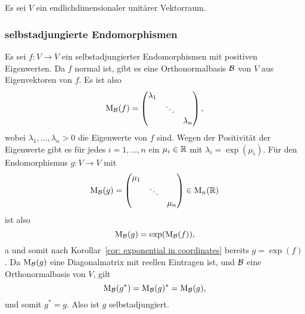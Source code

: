 \documentclass[a4paper, 10pt, numbers=noenddot]{scrartcl}
\begin{document}
\subsection{}
Es sei $V$ ein endlichdimensionaler unitärer Vektorraum.


\subsubsection{selbstadjungierte Endomorphismen}
Es sei $f \colon V \to V$ ein selbstadjungierter Endomorphismen mit positiven Eigenwerten.
Da $f$ normal ist, gibt es eine Orthonormalbasis $\mathcal{B}$ von $V$ aus Eigenvektoren von $f$.
Es ist also
\[
  \operatorname{M}_{\mathcal{B}}(f)
  =
  \begin{pmatrix}
    \lambda_1 &         &           \\
              & \ddots  &           \\
              &         & \lambda_n
  \end{pmatrix},
\]
wobei $\lambda_1, \dotsc, \lambda_n > 0$ die Eigenwerte von $f$ sind.
Wegen der Positivität der Eigenwerte gibt es für jedes $i = 1, \dotsc, n$ ein $\mu_i \in \mathbb{R}$ mit $\lambda_i = \exp(\mu_i)$.
Für den Endomorphismus $g \colon V \to V$ mit
\[
  \operatorname{M}_{\mathcal{B}}(g)
  =
  \begin{pmatrix}
    \mu_1 &         &       \\
          & \ddots  &       \\
          &         & \mu_n
  \end{pmatrix}
  \in \operatorname{M}_n(\mathbb{R})
\]
ist also
\[
  \operatorname{M}_{\mathcal{B}}(g) = \exp( \operatorname{M}_{\mathcal{B}}(f) ),
\]a
und somit nach Korollar~\ref{cor: exponential in coordinates} bereits $g = \exp(f)$.
Da $\operatorname{M}_{\mathcal{B}}(g)$ eine Diagonalmatrix mit reellen Eintragen ist, und $\mathcal{B}$ eine Orthonormalbasis von $V$, gilt
\[
    \operatorname{M}_{\mathcal{B}}(g^*)
  = \operatorname{M}_{\mathcal{B}}(g)^*
  = \operatorname{M}_{\mathcal{B}}(g),
\]
und somit $g^* = g$.
Also ist $g$ selbstadjungiert.
\end{document}
